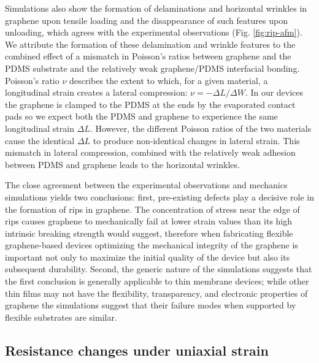 \documentclass[edeposit,fullpage,draftthesis]{uiucthesis2009}
\begin{document}
        Simulations also show the formation of delaminations and horizontal wrinkles in
        graphene upon tensile loading and the disappearance of such features upon
        unloading, which agrees with the experimental observations (Fig. \ref{fig:rip-afm}). We
        attribute the formation of these delamination and wrinkle features to the
        combined effect of a mismatch in Poisson's ratios between graphene and the PDMS
        substrate and the relatively weak graphene/PDMS interfacial bonding. 
        Poisson's ratio $\nu$ describes the extent to which, for a given material, a longitudinal strain creates a lateral
        compression: $\nu = -\Delta L / \Delta W$. In our devices the graphene is clamped to the PDMS
        at the ends by the evaporated contact pads so we expect both the PDMS and graphene
        to experience the same longitudinal strain $\Delta L$. However, the different Poisson
        ratios of the two materials cause the identical $\Delta L$ to produce non-identical changes in 
        lateral strain. This mismatch in lateral compression, combined with the relatively weak
        adhesion between PDMS and graphene leads to the horizontal wrinkles.
        
        
        The close agreement between the experimental observations and mechanics
        simulations yields two conclusions: first, pre-existing defects play a decisive
        role in the formation of rips in graphene. The concentration of stress near the
        edge of rips causes graphene to mechanically fail at lower strain values than
        its high intrinsic breaking strength would suggest, therefore when fabricating
        flexible graphene-based devices optimizing the mechanical integrity of the
        graphene is important not only to maximize the initial quality of the device
        but also its subsequent durability. Second, the generic nature of the
        simulations suggests that the first conclusion is generally applicable to thin
        membrane devices; while other thin films may not have the flexibility,
        transparency, and electronic properties of graphene the simulations suggest
        that their failure modes when supported by flexible substrates are similar.

    \subsection{Resistance changes under uniaxial strain}
    
\end{document}
